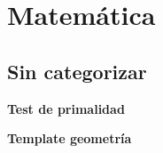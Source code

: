 \section{Matemática}
    

    \subsection{Sin categorizar}
        \textbf{Test de primalidad}
        

        \textbf{Template geometría}
        